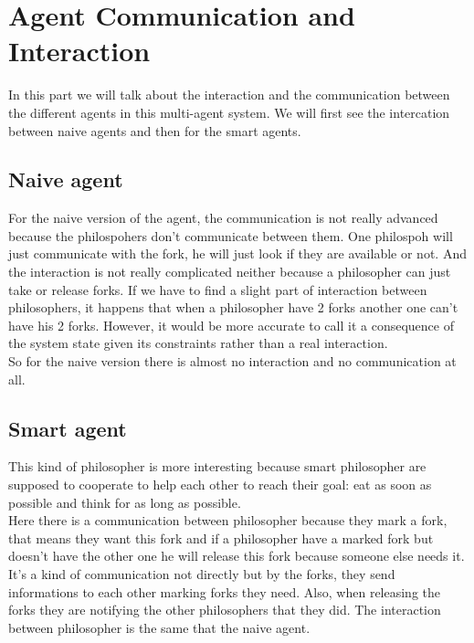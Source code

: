 \section{Agent Communication and Interaction}
In this part we will talk about the interaction and the communication between the different agents in this multi-agent system. We will first see the intercation between naive agents and then for the smart agents.

\subsection{Naive agent}
For the naive version of the agent, the communication is not really advanced because the philospohers don't communicate between them. One philospoh will just communicate with the fork, he will just look if they are available or not. And the interaction is not really complicated neither because a philosopher can just take or release forks. If we have to find a slight part of interaction between philosophers, it happens that when a philosopher have 2 forks another one can't have his 2 forks. However, it would be more accurate to call it a consequence of the system state given its constraints rather than a real interaction.\\
So for the naive version there is almost no interaction and no communication at all.

\subsection{Smart agent}
This kind of philosopher is more interesting because smart philosopher are supposed to cooperate to help each other to reach their goal: eat as soon as possible and think for as long as possible.\\
Here there is a communication between philosopher because they mark a fork, that means they want this fork and if a philosopher have a marked fork but doesn't have the other one he will release this fork because someone else needs it.\\
It's a kind of communication not directly but by the forks, they send informations to each other marking forks they need. Also, when releasing the forks they are notifying the other philosophers that they did.
The interaction between philosopher is the same that the naive agent.
